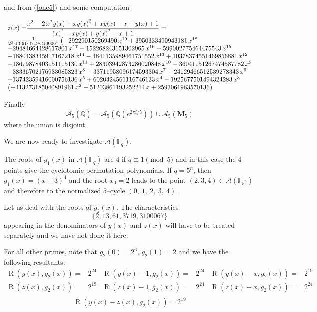 \documentclass[a4paper,twoside]{article}
\begin{document}
and from (\ref{one5}) and some computation
\begin{small}
$$\begin{array}{l}\mbox{\normalsize $z(x)=$}
\displaystyle{{\frac {{x}^{3}-2\,{x}^{2}y(x)+x{y(x)}^{2}+x y(x)-
x-y(x)+1}{{(x)}^{2}-x y(x)+{y(x)}^{2}-x+1}
}}=\\
\frac{1}{2^{3}\cdot13\cdot61\cdot3719\cdot3100067}\left(-292290150269490\,{x}^{19}+3950333490943181\,{x}^{18}\right.\\
-29484664428617801\,{x}^{17}+152268243151302965\,{x}^{16}-599002775464475543\,{x}^{15}\\
+1880438345917167218\,{x}^{14}-4841135989461751552\,{x}^{13}+10378374551469856881\,{x}^{12}\\
-18679878403151115130\,{x}^{11}+28303942873286020848\,{x}^{10}-36041151267474587782\,{x}^{9}\\
+38336702176933085823\,{x}^{8}-33711958096174593304\,{x}^{7}+24129466512539278343\,{x}^{6}\\
-13742359416000756136\,{x}^{5}+6020424561116746133\,{x}^{4}-1925677501494324283\,{x}^{3}\\
\left(+413273185040891961\,{x}^{2}-51203861193252214\,x+2593061963570136\right)
\end{array}
$$
\end{small}

Finally
$$\mathcal A_5(\overline{\mathbb Q})=\mathcal A_5({\mathbb Q}(e^{2\pi i/5}))\cup
\mathcal A_5({\mathbf M}_5)$$
where the union is disjoint.

We are now ready to investigate $\mathcal A(\mathbb F_q)$.

The roots of $g_1(x)$ in $\mathcal A(\mathbb F_q)$ are $4$ if
$q\equiv1\pmod 5$ and in this case the $4$ points give the
cyclotomic permutation polynomials. If $q=5^n$, then $g_1(x)=
(x+3)^4$ and the root $x_0=2$ leads to the point $(2,3,4)\in
\mathcal A(\mathbb F_{5^n})$ and therefore to the normalized
$5$--cycle $(0,\ 1,\ 2,\ 3,\ 4)$.

Let us deal with the roots of $g_2(x)$. The characteristics
\begin{equation}\label{bad5}
\{2, 13, 61, 3719, 3100067 \}\end{equation}
appearing in the denominators of $y(x)$ and $z(x)$ will have to
be treated separately and we have not done it here.

For all other primes, note that $g_2(0)=2^6$, $g_2(1)=2$ and we have the following resultants:
$$
\begin{array}{rlrlrl}
\operatorname{R}(y(x),g_2(x))=&2^{24} &
\operatorname{R}(y(x)-1,g_2(x))=&2^{24} &
\operatorname{R}(y(x)-x,g_2(x))=&2^{19}\\
\operatorname{R}(z(x),g_2(x))=& 2^{19} &
\operatorname{R}(z(x)-1,g_2(x))=&2^{24} &
\operatorname{R}(z(x)-x,g_2(x))=&2^{24}\\
\end{array}
$$
$$\operatorname{R}(y(x)-z(x),g_2(x)) = 2^{19}
$$
\end{document}
